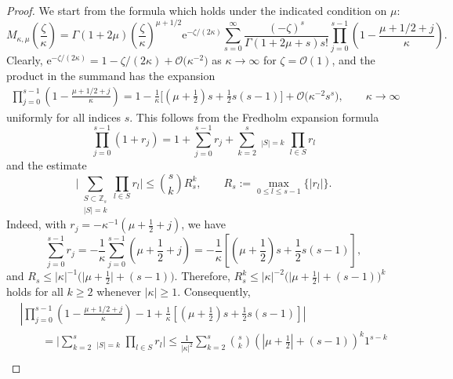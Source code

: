 \documentclass[11pt]{article}
\numberwithin{equation}{section}
\numberwithin{equation}{section}
\newcommand{\ee}{\mathrm{e}}
\begin{document}
\begin{proof}
We start from the formula \cite[equation~(13.14.6)]{DLMF} which holds under the indicated condition on $\mu$:
\begin{equation*}
 M_{\kappa,\mu}\left(\frac{\zeta}{\kappa}\right)=
 \Gamma(1+2\mu)\left(\frac{\zeta}{\kappa}\right)^{\mu+1/2}\ee^{-\zeta/(2\kappa)}\sum_{s=0}^\infty\frac{(-\zeta)^s}{\Gamma(1+2\mu+s)s!}\prod_{j=0}^{s-1}\left(1-\frac{\mu+1/2+j}{\kappa}\right).
\end{equation*}
Clearly, $\ee^{-\zeta/(2\kappa)}=1-\zeta/(2\kappa)+\mathcal{O}\big(\kappa^{-2}\big)$ as $\kappa\to\infty$ for $\zeta=\mathcal{O}(1)$, and the product in the summand has the expansion
\begin{gather}
 \prod_{j=0}^{s-1}\left(1-\frac{\mu+1/2+j}{\kappa}\right) = 1 -\frac{1}{\kappa}\bigg[\left(\mu+\frac{1}{2}\right)s +\frac{1}{2}s(s-1)\bigg] + \mathcal{O}\big(\kappa^{-2}s^s\big),\qquad\kappa\to\infty\!\!\!
\label{eq:uniform-estimate}
\end{gather}
uniformly for all indices $s$.
This follows from the Fredholm expansion formula
\begin{equation*}
 \prod_{j=0}^{s-1}(1+r_j) = 1+\sum_{j=0}^{s-1}r_j + \sum_{k=2}^{s}
 \mathop{\sum_{S\subset \mathbb{Z}_s}}_{|S|=k}\prod_{l\in S}r_l
\end{equation*}
and the estimate
\begin{equation*}
 \Biggl| \sum_{\substack{S\subset \mathbb{Z}_s \\ |S|=k}}\prod_{l\in S}r_l\Biggr|\le \binom{s}{k}R_s^k,\qquad R_s:=\max_{0\le l\le s-1}\{|r_l|\}.
\end{equation*}
Indeed, with $r_j=-\kappa^{-1}(\mu+\frac{1}{2}+j)$, we have
\begin{equation*}
 \sum_{j=0}^{s-1}r_j=-\frac{1}{\kappa}\sum_{j=0}^{s-1}\left(\mu+\frac{1}{2}+j\right) = -\frac{1}{\kappa}\left[\left(\mu+\frac{1}{2}\right)s + \frac{1}{2}s(s-1)\right],
\end{equation*}
and $R_s\le |\kappa|^{-1}\big(\big|\mu+\frac{1}{2}\big| + (s-1)\big)$. Therefore, $R_s^k\le |\kappa|^{-2}\big(\big|\mu+\frac{1}{2}\big|+(s-1)\big)^k$ holds for all $k\ge 2$ whenever $|\kappa|\ge 1$. Consequently,
\begin{gather*}
 \left|\prod_{j=0}^{s-1}\left(1-\frac{\mu+1/2+j}{\kappa}\right)-1+\right. \left.\frac{1}{\kappa}\left[\left(\mu+\frac{1}{2}\right)s+ \frac{1}{2}s(s-1)\right]\right|\\
 \qquad=\Biggl|\sum_{k=2}^s\mathop{\sum_{S\subset\mathbb{Z}_s}}_{|S|=k}\prod_{l\in S}r_l\Biggr|\le \frac{1}{|\kappa|^2}\sum_{k=2}^s\binom{s}{k}\left(\left|\mu+\frac{1}{2}\right|+(s-1)\right)^k1^{s-k}\\

\end{gather*}
\end{proof}
\end{document}
